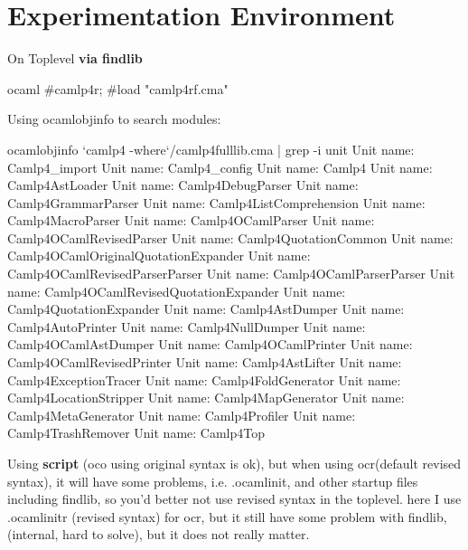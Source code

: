 \section{Experimentation Environment}

On Toplevel {\bf via findlib}
\begin{ocamlcode}
ocaml
#camlp4r;
#load "camlp4rf.cma"
\end{ocamlcode}

Using ocamlobjinfo to search modules:     
\begin{bluetext}
ocamlobjinfo `camlp4 -where`/camlp4fulllib.cma | grep -i unit
Unit name: Camlp4_import
Unit name: Camlp4_config
Unit name: Camlp4
Unit name: Camlp4AstLoader
Unit name: Camlp4DebugParser
Unit name: Camlp4GrammarParser
Unit name: Camlp4ListComprehension
Unit name: Camlp4MacroParser
Unit name: Camlp4OCamlParser
Unit name: Camlp4OCamlRevisedParser
Unit name: Camlp4QuotationCommon
Unit name: Camlp4OCamlOriginalQuotationExpander
Unit name: Camlp4OCamlRevisedParserParser
Unit name: Camlp4OCamlParserParser
Unit name: Camlp4OCamlRevisedQuotationExpander
Unit name: Camlp4QuotationExpander
Unit name: Camlp4AstDumper
Unit name: Camlp4AutoPrinter
Unit name: Camlp4NullDumper
Unit name: Camlp4OCamlAstDumper
Unit name: Camlp4OCamlPrinter
Unit name: Camlp4OCamlRevisedPrinter
Unit name: Camlp4AstLifter
Unit name: Camlp4ExceptionTracer
Unit name: Camlp4FoldGenerator
Unit name: Camlp4LocationStripper
Unit name: Camlp4MapGenerator
Unit name: Camlp4MetaGenerator
Unit name: Camlp4Profiler
Unit name: Camlp4TrashRemover
Unit name: Camlp4Top
\end{bluetext}


Using \textbf{script} (oco using original syntax is ok), but when
using ocr(default revised syntax), it will have some problems,
i.e. .ocamlinit, and other startup files including findlib, so you'd
better not use revised syntax in the toplevel. here I use
.ocamlinitr (revised syntax) for ocr, but it still have some problem
with findlib, (internal, hard to solve), but it does not really matter.




